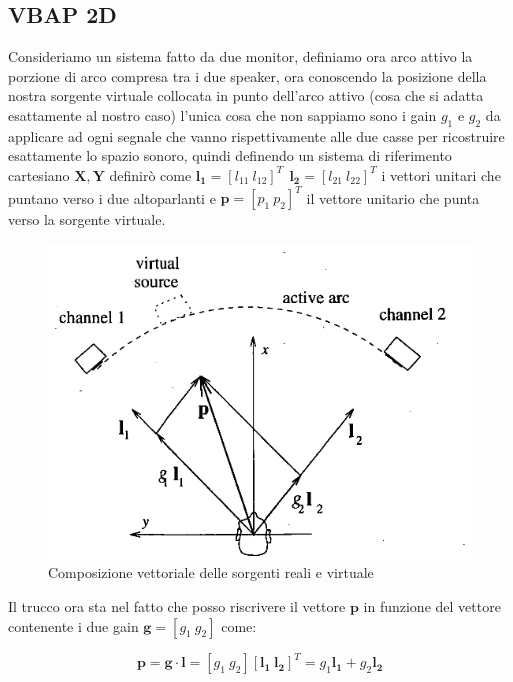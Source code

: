 \documentclass[12pt,a4paper]{report}
\begin{document}
\subsection{VBAP 2D}\label{c}
Consideriamo un sistema fatto da due monitor, definiamo ora arco attivo la porzione di arco compresa tra i due speaker, ora conoscendo la posizione della nostra sorgente virtuale collocata in punto dell'arco attivo (cosa che si adatta esattamente al nostro caso) l'unica cosa che non sappiamo sono i gain $g_1$ e $g_2$ da applicare ad ogni segnale che vanno rispettivamente alle due casse per ricostruire esattamente lo spazio sonoro, quindi definendo un sistema di riferimento cartesiano $ \boldsymbol{X},\boldsymbol{Y}$ definirò come $ \boldsymbol{l_{1}}= {\left[ l_{11} \ l_{12} \right]}^T \ \  \boldsymbol{l_{2}}= {\left[ l_{21} \ l_{22} \right]}^T$ i vettori unitari che puntano verso i due altoparlanti e $\boldsymbol{p}= {\left[ p_1 \ p_2 \right]}^T$ il vettore unitario che punta verso la sorgente virtuale.\\ 

\begin{figure}[htbp]
	\centering
	\includegraphics[scale=0.48]{figures/matrix2d.png}
	\caption {Composizione vettoriale delle sorgenti reali e virtuale} 
	\label{fig:vettori2d}
	\end{figure}

Il trucco ora sta nel fatto che posso riscrivere il vettore $\boldsymbol{p}$ in funzione del vettore contenente i due gain $\boldsymbol{g}= \left[ g_1 \ g_2 \right]$ come:

\begin{equation}
\boldsymbol{p}= \boldsymbol{g} \cdot \boldsymbol{l} = \left[g_1 \ g_2 \right] \left[\boldsymbol{l_{1}} \ \boldsymbol{l_{2}} \right]^T = g_1 \boldsymbol{l_{1}} + g_2 \boldsymbol{l_{2}}
\label{eq:bbbb}
\end{equation}
\end{document}

